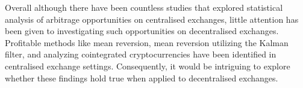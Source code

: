 \noindent Overall although there have been countless studies that explored statistical analysis of arbitrage opportunities on centralised exchanges, little attention has been given to investigating such opportunities on decentralised exchanges. Profitable methods like mean reversion, mean reversion utilizing the Kalman filter, and analyzing cointegrated cryptocurrencies have been identified in centralised exchange settings. Consequently, it would be intriguing to explore whether these findings hold true when applied to decentralised exchanges.
